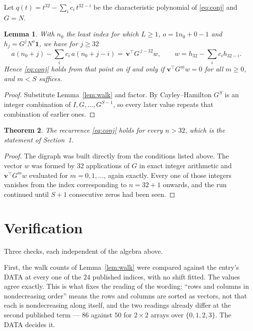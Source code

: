 \documentclass[11pt,a4paper]{article}
\theoremstyle{plain}
\newtheorem{theorem}{Theorem}
\newtheorem{lemma}[theorem]{Lemma}
\theoremstyle{definition}
\begin{document}
Let $q(t)=t^{32}-\sum_i c_i\,t^{32-i}$ be the characteristic polynomial of
\eqref{eq:conj} and $G=N$.

\begin{lemma}\label{lem:crit}
With $n_0$ the least index for which $L\ge1$, $o=1n_0+0-1$ and
$h_j=G^{j}N^{o}\mathbf{1}$, we have for $j\ge32$
\[
a(n_0+j)-\sum_i c_i\,a(n_0+j-i)=\,\mathbf{v}^{\!\top}G^{\,j-32}w,
\qquad w=h_{32}-\sum_i c_ih_{32-i} .
\]
Hence \eqref{eq:conj} holds from that point on if and only if
$\mathbf{v}^{\!\top}G^{m}w=0$ for all $m\ge0$, and $m<S$ suffices.
\end{lemma}

\begin{proof}
Substitute Lemma~\ref{lem:walk} and factor. By Cayley--Hamilton $G^{S}$ is an integer
combination of $I,G,\dots,G^{S-1}$, so every later value repeats that combination of
earlier ones.
\end{proof}

\begin{theorem}
The recurrence \eqref{eq:conj} holds for every $n>32$, which is the statement of
Section~1.
\end{theorem}

\begin{proof}
The digraph was built directly from the conditions listed above. The vector $w$ was formed by
$32$ applications of $G$ in exact integer arithmetic and $\mathbf{v}^{\!\top}G^{m}w$
evaluated for $m=0,1,\dots$, again exactly. Every one of those integers vanishes from the
index corresponding to $n=32+1$ onwards, and the run continued until $S+1$ consecutive
zeros had been seen.
\end{proof}

\section{Verification}

Three checks, each independent of the algebra above.

First, the walk counts of Lemma~\ref{lem:walk} were compared against the entry's DATA at
every one of the $24$ published indices, with no shift fitted. The values agree exactly.
This is what fixes the reading of the wording: ``rows and columns in nondecreasing order''
means the rows and columns are sorted as vectors, not that each is nondecreasing along
itself, and the two readings already differ at the second published term --- $86$ against
$50$ for $2\times2$ arrays over $\{0,1,2,3\}$. The DATA decides it.
\end{document}
